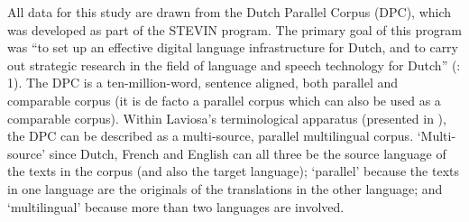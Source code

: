 All data for this study are drawn from the Dutch Parallel Corpus (DPC), which was developed as part of the STEVIN program. The primary goal of this program was “to set up an effective digital language infrastructure for Dutch, and to carry out strategic research in the field of language and speech technology for Dutch” (\citealt{Spyns2013}: 1). The DPC is a ten-million-word, sentence aligned, both parallel and comparable corpus (it is de facto a parallel corpus which can also be used as a comparable corpus). Within Laviosa’s terminological apparatus (presented in ), the DPC can be described as a multi-source, parallel multilingual corpus. ‘Multi-source’ since Dutch, French and English can all three be the source language of the texts in the corpus (and also the target language); ‘parallel’ because the texts in one language are the originals of the translations in the other language; and ‘multilingual’ because more than two languages are involved.



